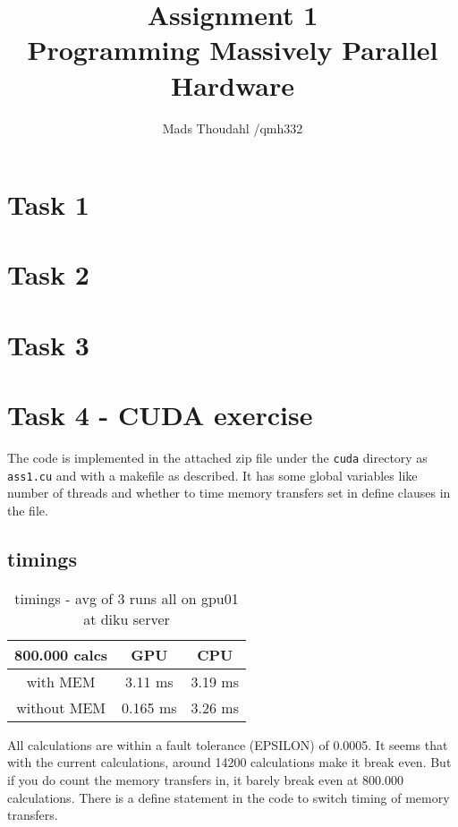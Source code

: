 \documentclass[a4paper,10pt]{article}
\title{Assignment 1  \\Programming Massively Parallel Hardware }
\author{Mads Thoudahl /qmh332}
\begin{document}
\maketitle

\section{Task 1}

\section{Task 2}

\section{Task 3}

\section{Task 4 - CUDA exercise}

The code is implemented in the attached zip file under the \texttt{cuda} directory as \texttt{ass1.cu} and with a makefile as described.
It has some global variables like number of threads and whether to time memory transfers set in define clauses in the file.

\subsection{timings}

\begin{table}[ht]
\caption{timings - avg of 3 runs all on gpu01 at diku server}
\centering
\begin{tabular}{c|c|c}
 800.000 calcs & GPU & CPU \\
\hline with MEM & 3.11 ms & 3.19 ms\\
\hline without MEM & 0.165 ms & 3.26 ms
\end{tabular}
\end{table}
All calculations are within a fault tolerance (EPSILON) of 0.0005.
It seems that with the current calculations, around 14200 calculations make it break even. 
But if you do count the memory transfers in, it barely break even at 800.000 calculations.
There is a define statement in the code to switch timing of memory transfers.
\end{document}
